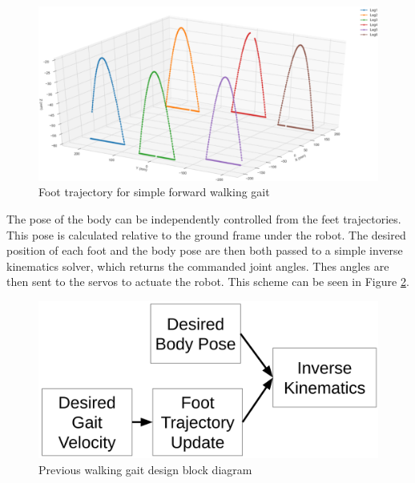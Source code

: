 \begin{figure}[H]
    \centerline{\includegraphics[scale=0.1]{./03_related_work/figures/old_trajectory.png}}
    \caption{Foot trajectory for simple forward walking gait}
    \label{fig:old_gait}
\end{figure}

The pose of the body can be independently controlled from the feet trajectories. This pose is calculated relative to the ground frame under the robot. The desired position of each foot and the body pose are then both passed to a simple inverse kinematics solver, which returns the commanded joint angles. Thes angles are then sent to the servos to actuate the robot. This scheme can be seen in Figure \ref{fig:old_gait_block_diagram}.

\begin{figure}[H]
    \centerline{\includegraphics[scale=0.09]{./03_related_work/figures/previous_kinematic_chain.png}}
    \caption{Previous walking gait design block diagram}
    \label{fig:old_gait_block_diagram}
\end{figure}
